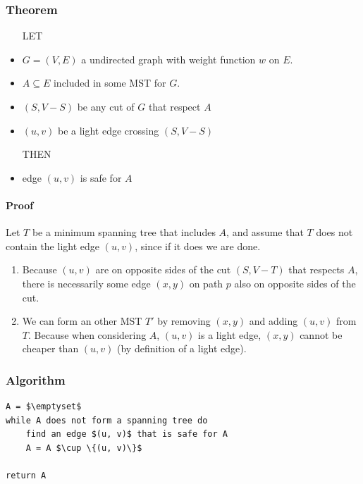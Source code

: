 \subsubsection{Theorem}
\begin{itemize}
    \item[LET]
    \item $G=(V,E)$ a undirected graph with weight function $w$ on $E$.
    \item $A \subseteq E$ included in some MST for $G$.
    \item $(S, V-S)$ be any cut of $G$ that respect $A$
    \item $(u,v)$ be a light edge crossing $(S, V-S)$
    \item[THEN]
    \item edge $(u, v)$ is safe for $A$
\end{itemize}

\paragraph{Proof}
Let $T$ be a minimum spanning tree that includes $A$, and assume
that $T$ does not contain the light edge $(u,v)$, since if it does we
are done.

\begin{enumerate}
    \item Because $(u,v)$ are on opposite sides
        of the cut $(S,V-T)$ that respects $A$,
        there is necessarily some edge $(x,y)$
        on path $p$ also on opposite sides of
        the cut.

    \item We can form an other MST $T'$ by
        removing $(x,y)$ and adding $(u,v)$ from
        $T$. Because when considering $A$,
        $(u,v)$ is a light edge, $(x,y)$ cannot be
        cheaper than $(u,v)$ (by definition of a
        light edge).
\end{enumerate}


\subsubsection{Algorithm}

\begin{lstlisting}[mathescape, caption=Generic-MST(V\,E\,c\,s\,t)]
A = $\emptyset$
while A does not form a spanning tree do
    find an edge $(u, v)$ that is safe for A
    A = A $\cup \{(u, v)\}$

return A
\end{lstlisting}

